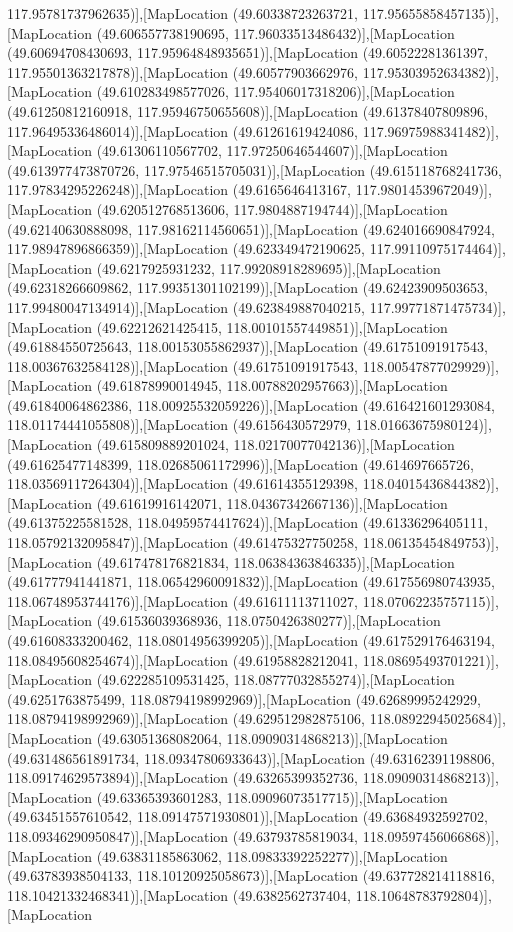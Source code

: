 117.95781737962635)],[MapLocation (49.60338723263721, 117.95655858457135)],[MapLocation (49.606557738190695, 117.96033513486432)],[MapLocation (49.60694708430693, 117.95964848935651)],[MapLocation (49.60522281361397, 117.95501363217878)],[MapLocation (49.60577903662976, 117.95303952634382)],[MapLocation (49.610283498577026, 117.95406017318206)],[MapLocation (49.61250812160918, 117.95946750655608)],[MapLocation (49.61378407809896, 117.96495336486014)],[MapLocation (49.61261619424086, 117.96975988341482)],[MapLocation (49.61306110567702, 117.97250646544607)],[MapLocation (49.613977473870726, 117.97546515705031)],[MapLocation (49.615118768241736, 117.97834295226248)],[MapLocation (49.6165646413167, 117.98014539672049)],[MapLocation (49.620512768513606, 117.9804887194744)],[MapLocation (49.62140630888098, 117.98162114560651)],[MapLocation (49.624016690847924, 117.98947896866359)],[MapLocation (49.623349472190625, 117.99110975174464)],[MapLocation (49.6217925931232, 117.99208918289695)],[MapLocation (49.62318266609862, 117.99351301102199)],[MapLocation (49.62423909503653, 117.99480047134914)],[MapLocation (49.623849887040215, 117.99771871475734)],[MapLocation (49.62212621425415, 118.00101557449851)],[MapLocation (49.61884550725643, 118.00153055862937)],[MapLocation (49.61751091917543, 118.00367632584128)],[MapLocation (49.61751091917543, 118.00547877029929)],[MapLocation (49.61878990014945, 118.00788202957663)],[MapLocation (49.61840064862386, 118.00925532059226)],[MapLocation (49.616421601293084, 118.01174441055808)],[MapLocation (49.6156430572979, 118.01663675980124)],[MapLocation (49.615809889201024, 118.02170077042136)],[MapLocation (49.61625477148399, 118.02685061172996)],[MapLocation (49.614697665726, 118.03569117264304)],[MapLocation (49.61614355129398, 118.04015436844382)],[MapLocation (49.61619916142071, 118.04367342667136)],[MapLocation (49.61375225581528, 118.04959574417624)],[MapLocation (49.61336296405111, 118.05792132095847)],[MapLocation (49.61475327750258, 118.06135454849753)],[MapLocation (49.617478176821834, 118.06384363846335)],[MapLocation (49.61777941441871, 118.06542960091832)],[MapLocation (49.617556980743935, 118.06748953744176)],[MapLocation (49.61611113711027, 118.07062235757115)],[MapLocation (49.61536039368936, 118.0750426380277)],[MapLocation (49.61608333200462, 118.08014956399205)],[MapLocation (49.617529176463194, 118.08495608254674)],[MapLocation (49.61958828212041, 118.08695493701221)],[MapLocation (49.622285109531425, 118.08777032855274)],[MapLocation (49.6251763875499, 118.08794198992969)],[MapLocation (49.62689995242929, 118.08794198992969)],[MapLocation (49.629512982875106, 118.08922945025684)],[MapLocation (49.63051368082064, 118.09090314868213)],[MapLocation (49.631486561891734, 118.09347806933643)],[MapLocation (49.63162391198806, 118.09174629573894)],[MapLocation (49.63265399352736, 118.09090314868213)],[MapLocation (49.63365393601283, 118.09096073517715)],[MapLocation (49.63451557610542, 118.09147571930801)],[MapLocation (49.63684932592702, 118.09346290950847)],[MapLocation (49.63793785819034, 118.09597456066868)],[MapLocation (49.63831185863062, 118.09833392252277)],[MapLocation (49.63783938504133, 118.10120925058673)],[MapLocation (49.637728214118816, 118.10421332468341)],[MapLocation (49.6382562737404, 118.10648783792804)],[MapLocation 